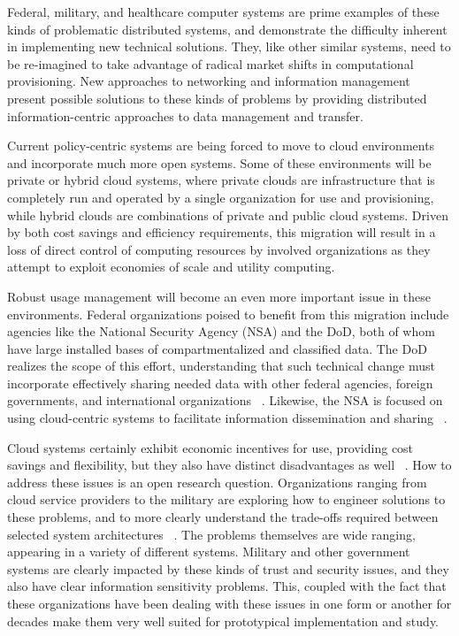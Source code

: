 Federal, military, and healthcare computer systems are prime examples of these kinds of problematic distributed systems, and demonstrate the difficulty inherent in implementing new technical solutions.  They, like other similar systems, need to be re-imagined to take advantage of radical market shifts in computational provisioning.  New approaches to networking and information management present possible solutions to these kinds of problems by providing distributed information-centric approaches to data management and transfer.

Current policy-centric systems are being forced to move to cloud environments and incorporate much more open systems.  Some of these environments will be private or hybrid cloud systems, where private clouds are infrastructure that is completely run and operated by a single organization for use and provisioning, while hybrid clouds are combinations of private and public cloud systems.  Driven by both cost savings and efficiency requirements, this migration will result in a loss of direct control of computing resources by involved organizations as they attempt to exploit economies of scale and utility computing.

Robust usage management will become an even more important issue in these environments.  Federal organizations poised to benefit from this migration include agencies like the National Security Agency (NSA) and the DoD, both of whom have large installed bases of compartmentalized and classified data.  The DoD realizes the scope of this effort, understanding that such technical change must incorporate effectively sharing needed data with other federal agencies, foreign governments, and international organizations ~\cite{proposal:info-sharing-strategy}.  Likewise, the NSA is focused on using cloud-centric systems to facilitate information dissemination and sharing ~\cite{proposal:nsa-cloud}.

Cloud systems certainly exhibit economic incentives for use, providing cost savings and flexibility, but they also have distinct disadvantages as well ~\cite{proposal:privacy-security-trust-cloud}.  How to address these issues is an open research question.  Organizations ranging from cloud service providers to the military are exploring how to engineer solutions to these problems, and to more clearly understand the trade-offs required between selected system architectures ~\cite{proposal:assured-info-sharing}.  The problems themselves are wide ranging, appearing in a variety of different systems.  Military and other government systems are clearly impacted by these kinds of trust and security issues, and they also have clear information sensitivity problems.  This, coupled with the fact that these organizations have been dealing with these issues in one form or another for decades make them very well suited for prototypical implementation and study.

